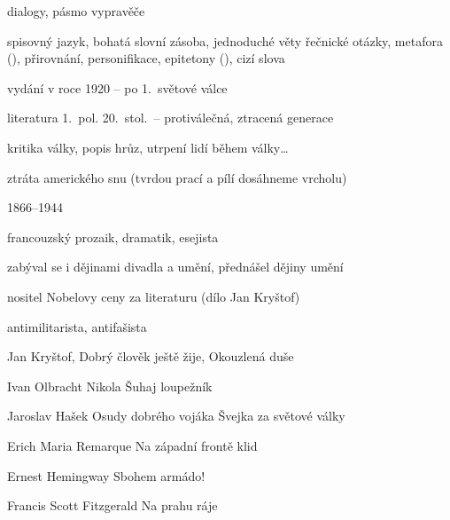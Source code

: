 { %
dialogy, pásmo vypravěče

\newpart

spisovný jazyk, bohatá slovní zásoba, jednoduché věty
řečnické otázky, metafora (),
přirovnání, personifikace, epitetony (), cizí slova

\begin{compactitem}
	\item vydání v roce 1920 -- po 1.~světové válce
	\item literatura 1.~pol. 20.~stol.~-- protiválečná, ztracená generace
	\item kritika války, popis hrůz, utrpení lidí během války\dots
	\item ztráta amerického snu (tvrdou prací a pílí dosáhneme vrcholu)
\end{compactitem}

\parag{\getauthor}
\begin{compactitem}
	\item 1866--1944
	\item francouzský prozaik, dramatik, esejista
	\item zabýval se i dějinami divadla a umění, přednášel dějiny umění
	\item nositel Nobelovy ceny za literaturu (dílo Jan Kryštof)
	\item antimilitarista, antifašista
	\item Jan Kryštof, Dobrý člověk ještě žije, Okouzlená duše
\end{compactitem}

\begin{compactdesc}
	\item[Ivan Olbracht] Nikola Šuhaj loupežník
	\item[Jaroslav Hašek] Osudy dobrého vojáka Švejka za světové války
	\item[Erich Maria Remarque] Na západní frontě klid
	\item[Ernest Hemingway] Sbohem armádo!
	\item[Francis Scott Fitzgerald] Na prahu ráje
\end{compactdesc}
}
